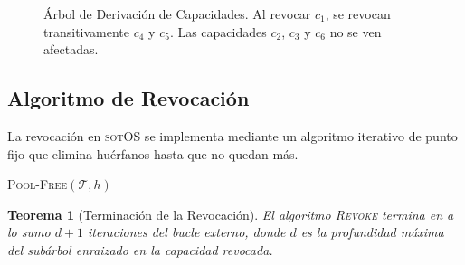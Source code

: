 \documentclass[11pt,twoside,openright]{book}
\theoremstyle{definition}
\theoremstyle{plain}
\newtheorem{theorem}{Teorema}[chapter]
\theoremstyle{remark}
\newcommand{\sotos}{\textsc{sotOS}}
\begin{document}
\begin{figure}[ht]
\caption{Árbol de Derivación de Capacidades. Al revocar $c_1$, se revocan transitivamente
$c_4$ y $c_5$. Las capacidades $c_2$, $c_3$ y $c_6$ no se ven afectadas.}
\label{fig:cdt}
\end{figure}

\subsection{Algoritmo de Revocación}

La revocación en \sotos{} se implementa mediante un algoritmo iterativo de punto fijo que
elimina huérfanos hasta que no quedan más.

\begin{algorithm}[H]
\caption{\textsc{Revoke}$(\mathcal{T}, h)$: Revocar una capacidad y todas sus derivadas.}
\label{alg:revoke}
\textsc{Pool-Free}$(\mathcal{T}, h)$
\end{algorithm}

\begin{theorem}[Terminación de la Revocación]
\label{thm:revoke-terminates}
El algoritmo \textsc{Revoke} termina en a lo sumo $d + 1$ iteraciones del bucle externo,
donde $d$ es la profundidad máxima del subárbol enraizado en la capacidad revocada.
\end{theorem}
\end{document}
